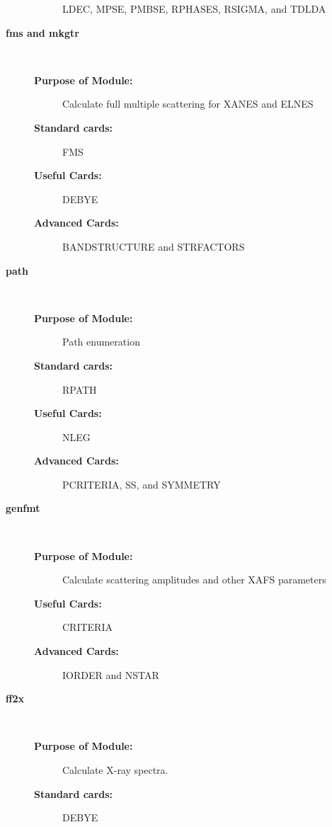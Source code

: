 \documentclass[11pt,oneside]{report} %
\renewcommand{\htmlref}[2]{\hyperlink{#2}{#1}}
\newcommand{\module}[1]{\textrm{\bf{#1}}}
\renewcommand{\htmlref}[2]{{#1}} %
\begin{document}
\begin{description}
\begin{description}
\begin{description}
    \htmlref{LDEC}{card:lde},
    \htmlref{MPSE}{card:mps},
    \htmlref{PMBSE}{card:pmb},
    \htmlref{RPHASES}{card:rph},
    \htmlref{RSIGMA}{card:rsi},
    and \htmlref{TDLDA}{card:tdl}
  \end{description}
\item[{\large\module{fms and mkgtr}}]\dotfill\  
  \begin{description}
  \item[\textbf{Purpose of Module:}] Calculate full multiple
    scattering for XANES and ELNES
  \item[\textbf{Standard cards:}] \htmlref{FMS}{card:fms}
  \item[\textbf{Useful Cards:}] \htmlref{DEBYE}{card:deb1}
  \item[\textbf{Advanced Cards:}] \htmlref{BANDSTRUCTURE}{card:ban}
    and \htmlref{STRFACTORS}{card:stf}
  \end{description}
\item[{\large\module{path}}]\dotfill\  
  \begin{description}
  \item[\textbf{Purpose of Module:}] Path enumeration
  \item[\textbf{Standard cards:}] \htmlref{RPATH}{card:rpa}
  \item[\textbf{Useful Cards:}] \htmlref{NLEG}{card:nle}
  \item[\textbf{Advanced Cards:}] 
  \htmlref{PCRITERIA}{card:pcr},
  \htmlref{SS}{card:ss}, 
  and \htmlref{SYMMETRY}{card:sym}
  \end{description}
\item[{\large\module{genfmt}}]\dotfill\  
  \begin{description}
  \item[\textbf{Purpose of Module:}] Calculate scattering amplitudes
    and other XAFS parameters
  \item[\textbf{Useful Cards:}] \htmlref{CRITERIA}{card:cri}
  \item[\textbf{Advanced Cards:}] \htmlref{IORDER}{card:ior} and
    \htmlref{NSTAR}{card:nst}
  \end{description}
\item[{\large\module{ff2x}}]\dotfill\ 
  \begin{description}
  \item[\textbf{Purpose of Module:}] Calculate X-ray spectra. 
  \item[\textbf{Standard cards:}] \htmlref{DEBYE}{card:deb2}

\end{description}
\end{description}
\end{description}
\end{document}
